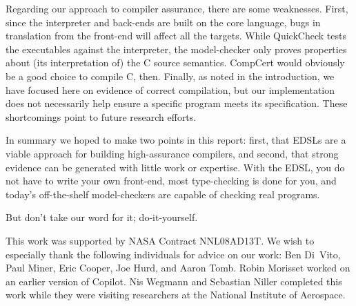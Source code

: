 \documentclass[9pt]{sigplanconf}
\begin{document}
Regarding our approach to compiler assurance, there are some weaknesses.  First,
since the interpreter and back-ends are built on the core language, bugs in
translation from the front-end will affect all the targets.  While QuickCheck
tests the executables against the interpreter, the model-checker only proves
properties about (its interpretation of) the C source semantics.  CompCert would
obviously be a good choice to compile C, then.  Finally, as noted in the
introduction, we have focused here on evidence of correct compilation, but our
implementation does not necessarily help ensure a specific program meets its
specification.  These shortcomings point to future research efforts.

In summary we hoped to make two points in this report: first, that EDSLs are a
viable approach for building high-assurance compilers, and second, that strong
evidence can be generated with little work or expertise.  With the EDSL, you do
not have to write your own front-end, most type-checking is done for you, and
today's off-the-shelf model-checkers are capable of checking real programs.

But don't take our word for it; do-it-yourself.

\acks 

This work was supported by NASA Contract NNL08AD13T.  We wish to especially
thank the following individuals for advice on our work: Ben Di~Vito, Paul Miner,
Eric Cooper, Joe Hurd, and Aaron Tomb.  Robin Morisset worked on an
earlier version of Copilot.  Nis Wegmann and Sebastian Niller completed this
work while they were visiting researchers at the National Institute of
Aerospace.   





\end{document}
